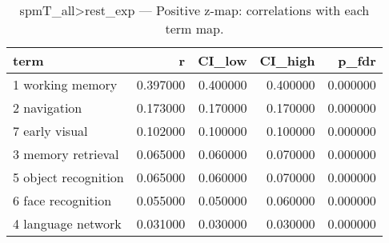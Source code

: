 \begin{table}
\caption{spmT_all>rest_exp — Positive z-map: correlations with each term map.}
\label{tab:spmT_all>rest_exp_pos}
\begin{tabular}{lrrrr}
\toprule
term & r & CI\_low & CI\_high & p\_fdr \\
\midrule
1 working memory & 0.397000 & 0.400000 & 0.400000 & 0.000000 \\
2 navigation & 0.173000 & 0.170000 & 0.170000 & 0.000000 \\
7 early visual & 0.102000 & 0.100000 & 0.100000 & 0.000000 \\
3 memory retrieval & 0.065000 & 0.060000 & 0.070000 & 0.000000 \\
5 object recognition & 0.065000 & 0.060000 & 0.070000 & 0.000000 \\
6 face recognition & 0.055000 & 0.050000 & 0.060000 & 0.000000 \\
4 language network & 0.031000 & 0.030000 & 0.030000 & 0.000000 \\
\bottomrule
\end{tabular}
\end{table}
